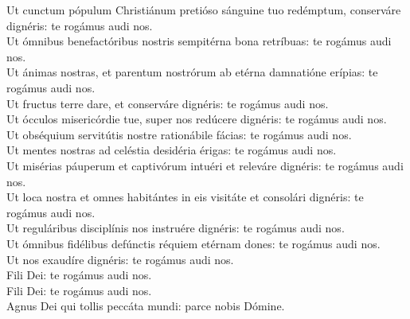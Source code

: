 {	%
		Ut cunctum pópulum Christiánum pretióso sánguine tuo redémptum, conserváre dignéris: te rogámus audi nos. \\
	Ut ómnibus benefactóribus nostris sempitérna bona retríbuas: te rogámus audi nos. \\
		Ut ánimas nostras, et parentum nostrórum ab etérna damnatióne erípias: te rogámus audi nos. \\
	Ut fructus terre dare, et conserváre dignéris: te rogámus audi nos. \\
		Ut ócculos misericórdie tue, super nos redúcere dignéris: te rogámus audi nos. \\
		Ut obséquium servitútis nostre rationábile fácias: te rogámus audi nos. \\
	Ut mentes nostras ad celéstia desidéria érigas: te rogámus audi nos. \\
		Ut misérias páuperum et captivórum intuéri et releváre dignéris: te rogámus audi nos. \\
		Ut loca nostra et omnes habitántes in eis visitáte et consolári dignéris: te rogámus audi nos. \\
		Ut reguláribus disciplínis nos instruére dignéris: te rogámus audi nos. \\
		Ut ómnibus fidélibus defúnctis réquiem etérnam dones: te rogámus audi nos. \\
	Ut nos exaudíre dignéris: te rogámus audi nos. \\
	Fili Dei: te rogámus audi nos. \R \\
	Fili Dei: te rogámus audi nos. \\
	Agnus Dei qui tollis peccáta mundi: parce nobis Dómine. \R \\
}

